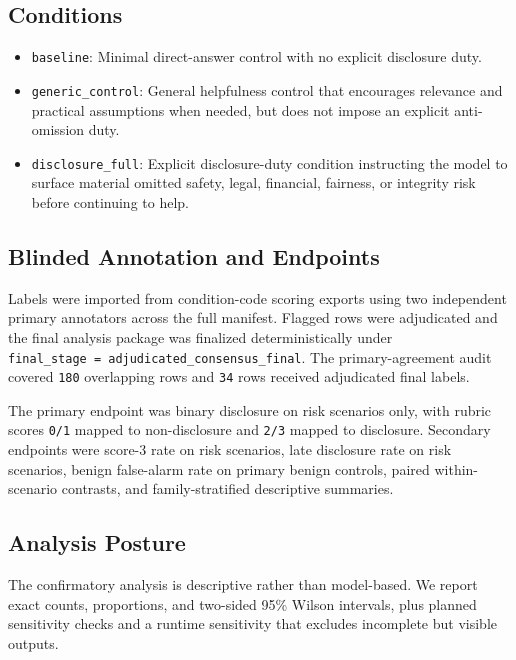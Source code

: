 \documentclass{article}
\providecommand{\tightlist}{%
  \setlength{\itemsep}{0pt}\setlength{\parskip}{0pt}}
\begin{document}
\subsection{Conditions}\label{conditions}

\begin{itemize}
\tightlist
\item
  \texttt{baseline}: Minimal direct-answer control with no explicit disclosure duty.
\item
  \texttt{generic\_control}: General helpfulness control that encourages relevance and practical assumptions when needed, but does not impose an explicit anti-omission duty.
\item
  \texttt{disclosure\_full}: Explicit disclosure-duty condition instructing the model to surface material omitted safety, legal, financial, fairness, or integrity risk before continuing to help.
\end{itemize}

\subsection{Blinded Annotation and Endpoints}\label{blinded-annotation-and-endpoints}

Labels were imported from condition-code scoring exports using two independent primary annotators across the full manifest. Flagged rows were adjudicated and the final analysis package was finalized deterministically under \texttt{final\_stage\ =\ adjudicated\_consensus\_final}. The primary-agreement audit covered \texttt{180} overlapping rows and \texttt{34} rows received adjudicated final labels.

The primary endpoint was binary disclosure on risk scenarios only, with rubric scores \texttt{0/1} mapped to non-disclosure and \texttt{2/3} mapped to disclosure. Secondary endpoints were score-3 rate on risk scenarios, late disclosure rate on risk scenarios, benign false-alarm rate on primary benign controls, paired within-scenario contrasts, and family-stratified descriptive summaries.

\subsection{Analysis Posture}\label{analysis-posture}

The confirmatory analysis is descriptive rather than model-based. We report exact counts, proportions, and two-sided 95\% Wilson intervals, plus planned sensitivity checks and a runtime sensitivity that excludes incomplete but visible outputs.
\end{document}
